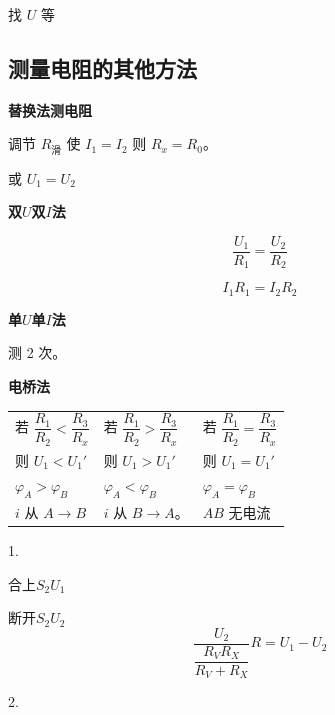 找 $U$ 等 %

\subsection{测量电阻的其他方法}
\textbf{替换法测电阻}


调节 $R_{\text{滑}}$ 使 $I_1=I_2$ 则 $R_x=R_0$。

\hspace{2em}或 $U_1=U_2$

\textbf{双$U$双$I$法}


\[\frac{U_1}{R_1}=\frac{U_2}{R_2}\]


\[I_1R_1=I_2R_2\]

\textbf{单$U$单$I$法}


测 2 次。

\textbf{电桥法}


\begin{center}
\renewcommand{\arraystretch}{2.0}
\begin{tabular}{@{}lll@{}}
若 $\dfrac{R_1}{R_2}<\dfrac{R_3}{R_x}$ & 若 $\dfrac{R_1}{R_2}>\dfrac{R_3}{R_x}$ & 若 $\dfrac{R_1}{R_2}=\dfrac{R_3}{R_x}$\\
则 $U_1<U_1'$ & 则 $U_1>U_1'$ & 则 $U_1=U_1'$\\
$\varphi_A>\varphi_B$ & $\varphi_A<\varphi_B$ & $\varphi_A=\varphi_B$\\
$i$ 从 $A\to B$ & $i$ 从 $B\to A$。 & $AB$ 无电流
\end{tabular}
\end{center}

1.

合上$S_2$\quad $U_1$

断开$S_2$\quad $U_2$
\[
\frac{U_2}{\dfrac{R_VR_X}{R_V+R_X}}R=U_1-U_2
\]

2.

